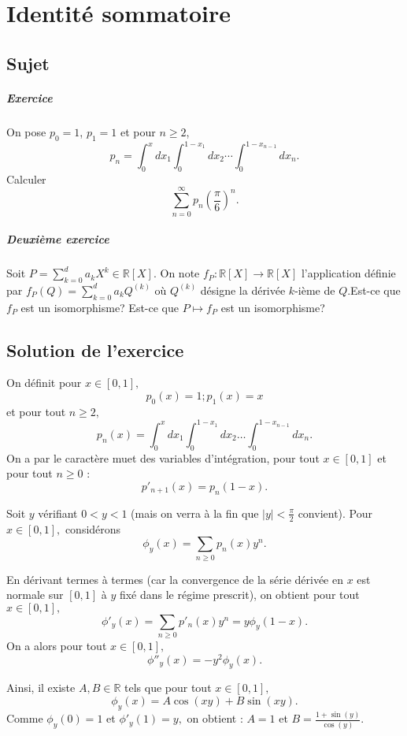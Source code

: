 \chapter{Identité sommatoire}

\section{Sujet}

\paragraph{Exercice}
On pose $p_{0}=1$, $p_{1} = 1$ et pour $n\geqslant 2$,
\[
p_{n}=\int_{0}^{x}dx_{1}\int_{0}^{1-x_{1}}dx_{2}\cdots\int_{0}^{1-x_{n-1}}dx_{n}.
\]
Calculer
\[
\sum_{n=0}^\infty p_n \left(\frac\pi6\right)^n.
\]
\paragraph{ Deuxième exercice}
Soit $P =\displaystyle \sum _{k=0}^d a_kX^k \in \mathbb R[X]. $ On note $f_P : \mathbb R[X] \to \mathbb R[X]$ l'application définie par $f_P(Q) = \displaystyle \sum _{k=0}^d a_k Q^{(k)}$ où $Q^{(k)}$ désigne la dérivée $k$-ième de $Q$.Est-ce que $f_P$ est un isomorphisme? Est-ce que $ P\longmapsto f_P$ est un isomorphisme?
\section{Solution de l'exercice}

On définit pour $x\in[0,1],$ $$p_{0}(x)=1;p_{1}(x)=x$$et pour tout $n\geq 2,$ $$p_{n}(x)=\int_{0}^{x}dx_{1}\int_{0}^{1-x_{1}}dx_{2}\ldots\int_{0}^{1-x_{n-1}}dx_{n}.$$
On a par le caractère muet des variables d'intégration, pour tout $x\in[0,1]$ et pour tout $n\geq 0$ : $$p'_{n+1}(x)=p_{n}(1-x).$$

Soit $y$ vérifiant $0<y<1$ (mais on verra à la fin que $\vert y\vert <\frac{\pi}{2}$ convient).
Pour $x\in[0,1],$ considérons $$\phi_{y}(x)=\sum_{n\geq 0}p_{n}(x)y^{n}.$$

En dérivant termes à termes (car la convergence de la série dérivée en $x$ est normale sur $[0,1]$ à $y$ fixé dans le régime prescrit), 
on obtient pour tout $x\in[0,1],$ $$\phi'_{y}(x)=\sum_{n\geq 0}p'_{n}(x)y^{n}=y\phi_{y}(1-x).$$
On a alors pour tout $x\in[0,1],$ $$ \phi''_{y}(x)=-y^{2}\phi_{y}(x).$$

Ainsi, il existe $A,B\in\mathbb{R}$ tels que pour tout $x\in[0,1],$ $$ \phi_{y}(x)=A\cos(xy)+B\sin(xy).$$
Comme $\phi_{y}(0)=1$ et $\phi'_{y}(1)=y,$ on obtient : $A=1$ et $\displaystyle B=\frac{1+\sin(y)}{\cos(y)}.$


